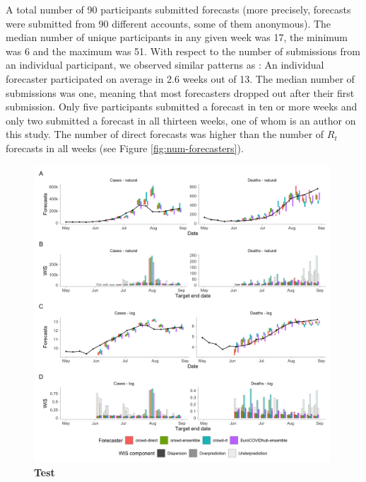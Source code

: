 \documentclass[10pt,a4paper,twocolumn]{article}
\begin{document}
A total number of 90 participants submitted forecasts (more precisely, forecasts were submitted from 90 different accounts, some of them anonymous). The median number of unique participants in any given week was 17, the minimum was 6 and the maximum was 51. With respect to the number of submissions from an individual participant, we observed similar patterns as \cite{bosseComparingHumanModelbased2022}: An individual forecaster participated on average in 2.6 weeks out of 13. The median number of submissions was one, meaning that most forecasters dropped out after their first submission. Only five participants submitted a forecast in ten or more weeks and only two submitted a forecast in all thirteen weeks, one of whom is an author on this study. The number of direct forecasts was higher than the number of $R_t$ forecasts in all weeks (see Figure \ref{fig:num-forecasters}). 


\begin{figure}[H]
\centering
\includegraphics[width=0.99\textwidth]{../output/figures/scores-and-forecasts.png}
\caption{\bf{Test}}
\label{fig:forecasts-scores}
\end{figure}
\end{document}
